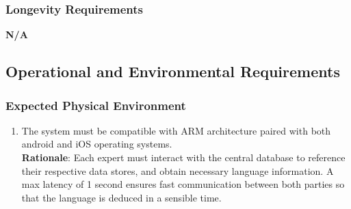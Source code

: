 \subsubsection{Longevity Requirements}
\label{ssub:longevity_requirements}
\textbf{N/A}


\subsection{Operational and Environmental Requirements}
\label{sub:operational_and_environmental_requirements}

\subsubsection{Expected Physical Environment}
\label{ssub:expected_physical_environment}
\begin{enumerate}[{OE-EPE}1. ]
	\item The system must be compatible with ARM architecture paired with both android and iOS operating systems.
	\\ \textbf{Rationale}: Each expert must interact with the central database to reference their respective data stores, and obtain necessary language information. A max latency of 1 second ensures fast communication between both parties so that the language is deduced in a sensible time. 
\end{enumerate}

